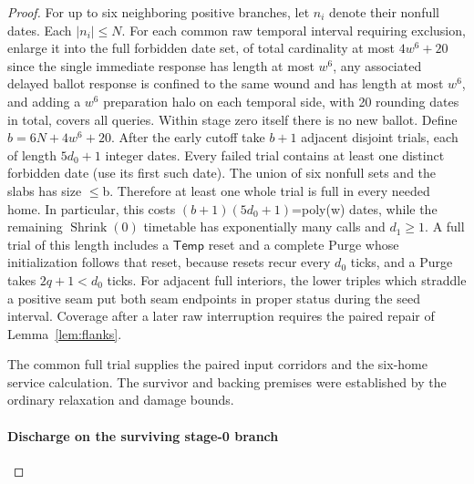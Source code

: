 \begin{proof}
For up to six neighboring positive branches, let \(n_i\) denote their nonfull dates. Each \(|n_i|\le N\). For each common raw temporal interval requiring exclusion, enlarge it into the full forbidden date set, of total cardinality at most \(4w^6+20\) since the single immediate response has length at most \(w^6\), any associated delayed ballot response is confined to the same wound and has length at most \(w^6\), and adding a \(w^6\) preparation halo on each temporal side, with 20 rounding dates in total, covers all queries. Within stage zero itself there is no new ballot. Define \(b=6N+4w^6+20\). After the early cutoff take \(b+1\) adjacent disjoint trials, each of length \(5d_0+1\) integer dates. Every failed trial contains at least one distinct forbidden date (use its first such date). The union of six nonfull sets and the slabs has size \(\le\)b. Therefore at least one whole trial is full in every needed home. In particular, this costs \((b+1)(5d_0+1)\)=poly(w) dates, while the remaining \(\operatorname{Shrink}(0)\) timetable has exponentially many calls and \(d_1\ge 1\). A full trial of this length includes a \(\mathsf{Temp}\) reset and a complete Purge whose initialization follows that reset, because resets recur every \(d_0\) ticks, and a Purge takes \(2q+1<d_0\) ticks. For adjacent full interiors, the lower triples which straddle a positive seam put both seam endpoints in proper status during the seed interval. Coverage after a later raw interruption requires the paired repair of Lemma~\ref{lem:flanks}.

The common full trial supplies the paired input corridors and the six-home service calculation. The survivor and backing premises were established by the ordinary relaxation and damage bounds.
\paragraph{Discharge on the surviving stage-0 branch}


\end{proof}
